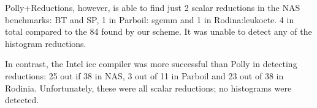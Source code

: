 Polly+Reductions, however, is able to find just 2 scalar reductions in
the NAS benchmarks: BT and SP, 1 in Parboil: sgemm and 1 in
Rodina:leukocte. 4 in total compared to the 84 found by our scheme. It
was unable to detect any of the histogram reductions.

In contrast, the Intel icc compiler was more successful than Polly in detecting 
reductions: 25  out if 38 in NAS, 3 out of 11 in Parboil and 23 out of 38 in Rodinia.
Unfortunately, these were all scalar reductions; no histograms were detected.


\NASDetectionData

\ParboilDetectionData

